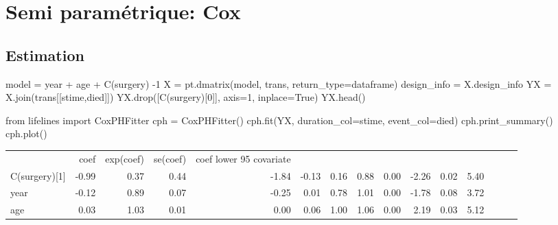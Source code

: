 \documentclass[
  12pt,
  letterpaper,
  DIV=11,
  numbers=noendperiod,
  onepage,
  openany]{scrreprt}
\newenvironment{Shaded}{\begin{snugshade}}{\end{snugshade}}
\newcommand{\DecValTok}[1]{\textcolor[rgb]{0.86,0.86,0.80}{#1}}
\newcommand{\ImportTok}[1]{\textcolor[rgb]{0.80,0.80,0.80}{#1}}
\newcommand{\NormalTok}[1]{\textcolor[rgb]{0.80,0.80,0.80}{#1}}
\newcommand{\OperatorTok}[1]{\textcolor[rgb]{0.94,0.94,0.82}{#1}}
\newcommand{\StringTok}[1]{\textcolor[rgb]{0.80,0.58,0.58}{#1}}
\newcommand{\VariableTok}[1]{\textcolor[rgb]{0.80,0.80,0.80}{#1}}
\begin{document}
\hypertarget{semi-paramuxe9trique-cox}{%
\section{Semi paramétrique: Cox}\label{semi-paramuxe9trique-cox}}

\hypertarget{estimation-2}{%
\subsection{Estimation}\label{estimation-2}}

\begin{Shaded}
\begin{Highlighting}[]
\NormalTok{model }\OperatorTok{=} \StringTok{\textquotesingle{}year + age + C(surgery) {-}1\textquotesingle{}}
\NormalTok{X }\OperatorTok{=}\NormalTok{ pt.dmatrix(model, trans, return\_type}\OperatorTok{=}\StringTok{\textquotesingle{}dataframe\textquotesingle{}}\NormalTok{)}
\NormalTok{design\_info }\OperatorTok{=}\NormalTok{ X.design\_info}
\NormalTok{YX }\OperatorTok{=}\NormalTok{ X.join(trans[[}\StringTok{\textquotesingle{}stime\textquotesingle{}}\NormalTok{,}\StringTok{\textquotesingle{}died\textquotesingle{}}\NormalTok{]])}
\NormalTok{YX.drop([}\StringTok{\textquotesingle{}C(surgery)[0]\textquotesingle{}}\NormalTok{], axis}\OperatorTok{=}\DecValTok{1}\NormalTok{, inplace}\OperatorTok{=}\VariableTok{True}\NormalTok{)}
\NormalTok{YX.head()}


\ImportTok{from}\NormalTok{ lifelines }\ImportTok{import}\NormalTok{ CoxPHFitter}
\NormalTok{cph }\OperatorTok{=}\NormalTok{ CoxPHFitter()}
\NormalTok{cph.fit(YX, duration\_col}\OperatorTok{=}\StringTok{\textquotesingle{}stime\textquotesingle{}}\NormalTok{, event\_col}\OperatorTok{=}\StringTok{\textquotesingle{}died\textquotesingle{}}\NormalTok{)}
\NormalTok{cph.print\_summary()}
\NormalTok{cph.plot()}
\end{Highlighting}
\end{Shaded}

\begin{tabular}{lrrrrrrrrrrr}
 & coef & exp(coef) & se(coef) & coef lower 95%
covariate &  &  &  &  &  &  &  &  &  &  &  \\
C(surgery)[1] & -0.99 & 0.37 & 0.44 & -1.84 & -0.13 & 0.16 & 0.88 & 0.00 & -2.26 & 0.02 & 5.40 \\
year & -0.12 & 0.89 & 0.07 & -0.25 & 0.01 & 0.78 & 1.01 & 0.00 & -1.78 & 0.08 & 3.72 \\
age & 0.03 & 1.03 & 0.01 & 0.00 & 0.06 & 1.00 & 1.06 & 0.00 & 2.19 & 0.03 & 5.12 \\
\end{tabular}
\end{document}
